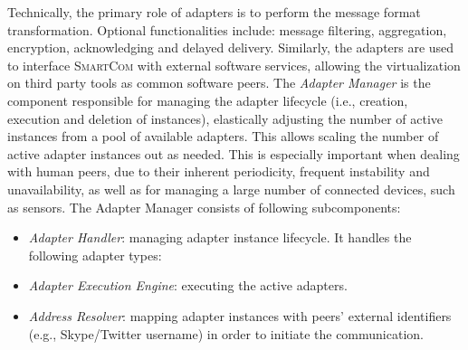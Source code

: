 \documentclass{llncs}
\newcommand{\mdl}{\textsc{SmartCom}}
\newcommand{\figfloat}[3][0.9]{
\begin{figure}[h] 
\centering
\texttt{[image: figures/\#2]}
\caption{#3}
\label{fig:#2}
\end{figure}
}
\begin{document}


    Technically, the primary role of adapters is to perform the message format transformation. Optional functionalities include: message filtering, aggregation, encryption, acknowledging and delayed delivery. Similarly, the adapters are used to interface \mdl{} with external software services, allowing the virtualization on third party tools as common software peers.
    The \emph{Adapter Manager} is the component responsible for managing the adapter lifecycle (i.e., creation, execution and deletion of instances), elastically adjusting the number of active instances from a pool of available adapters. This allows scaling the number of active adapter instances out as needed. This is especially important when dealing with human peers, due to their inherent periodicity, frequent instability and unavailability, as well as for managing a large number of connected devices, such as sensors. The Adapter Manager consists of following subcomponents: 
    \begin{itemize}[$\bullet$]
      \item \emph{Adapter Handler}: managing adapter instance lifecycle. It handles the following adapter types:  
      \item \emph{Adapter Execution Engine}: executing the active adapters.
      \item \emph{Address Resolver}: mapping adapter instances with peers' external identifiers (e.g., Skype/Twitter username) in order to initiate the communication.
    \end{itemize}
\end{document}
